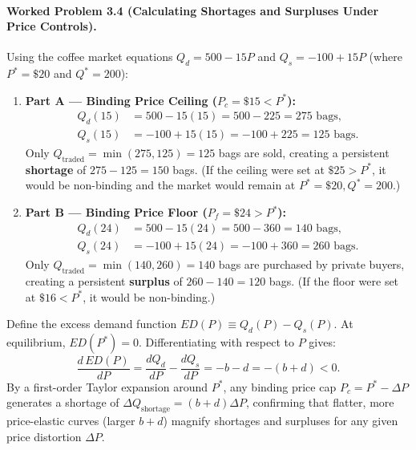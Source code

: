 \documentclass[11pt,letterpaper]{article}
\begin{document}
\paragraph{Worked Problem 3.4 (Calculating Shortages and Surpluses Under Price Controls).}
Using the coffee market equations $Q_d = 500 - 15P$ and $Q_s = -100 + 15P$ (where $P^* = \$20$ and $Q^* = 200$):
\begin{enumerate}
  \item \textbf{Part A — Binding Price Ceiling ($P_c = \$15 < P^*$):}
  \begin{align*}
    Q_d(15) &= 500 - 15(15) = 500 - 225 = 275 \text{ bags}, \\
    Q_s(15) &= -100 + 15(15) = -100 + 225 = 125 \text{ bags}.
  \end{align*}
  Only $Q_{\text{traded}} = \min(275, 125) = 125$ bags are sold, creating a persistent \textbf{shortage} of $275 - 125 = 150$ bags. (If the ceiling were set at $\$25 > P^*$, it would be non-binding and the market would remain at $P^* = \$20, Q^* = 200$.)
  \item \textbf{Part B — Binding Price Floor ($P_f = \$24 > P^*$):}
  \begin{align*}
    Q_d(24) &= 500 - 15(24) = 500 - 360 = 140 \text{ bags}, \\
    Q_s(24) &= -100 + 15(24) = -100 + 360 = 260 \text{ bags}.
  \end{align*}
  Only $Q_{\text{traded}} = \min(140, 260) = 140$ bags are purchased by private buyers, creating a persistent \textbf{surplus} of $260 - 140 = 120$ bags. (If the floor were set at $\$16 < P^*$, it would be non-binding.)
\end{enumerate}

\begin{coreprinciple}
Define the excess demand function $ED(P) \equiv Q_d(P) - Q_s(P)$. At equilibrium, $ED(P^*) = 0$. Differentiating with respect to $P$ gives:
$$\frac{d\,ED(P)}{dP} = \frac{dQ_d}{dP} - \frac{dQ_s}{dP} = -b - d = -(b + d) < 0.$$
By a first-order Taylor expansion around $P^*$, any binding price cap $P_c = P^* - \Delta P$ generates a shortage of $\Delta Q_{\text{shortage}} = (b + d)\Delta P$, confirming that flatter, more price-elastic curves (larger $b + d$) magnify shortages and surpluses for any given price distortion $\Delta P$.
\end{coreprinciple}
\end{document}
